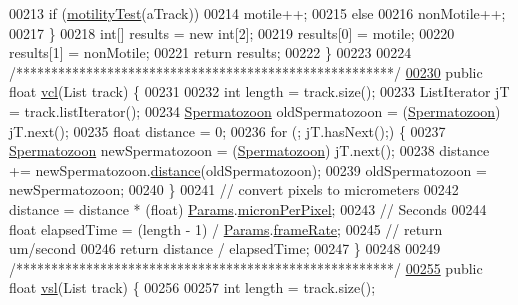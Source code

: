 \begin{DoxyCode}
00213       \textcolor{keywordflow}{if} (\hyperlink{classfunctions_1_1_kinematics_a5dbef047c19d4c554b08ba879eb7443f}{motilityTest}(aTrack))
00214         motile++;
00215       \textcolor{keywordflow}{else}
00216         nonMotile++;
00217     \}
00218     \textcolor{keywordtype}{int}[] results = \textcolor{keyword}{new} \textcolor{keywordtype}{int}[2];
00219     results[0] = motile;
00220     results[1] = nonMotile;
00221     \textcolor{keywordflow}{return} results;
00222   \}
00223   
00224   \textcolor{comment}{/******************************************************/}
\hypertarget{_kinematics_8java_source_l00230}{}\hyperlink{classfunctions_1_1_kinematics_af6e1e75567a927a9c627616cb68b0d7f}{00230}   \textcolor{keyword}{public} \textcolor{keywordtype}{float} \hyperlink{classfunctions_1_1_kinematics_af6e1e75567a927a9c627616cb68b0d7f}{vcl}(List track) \{
00231 
00232     \textcolor{keywordtype}{int} length = track.size();
00233     ListIterator jT = track.listIterator();
00234     \hyperlink{classdata_1_1_spermatozoon}{Spermatozoon} oldSpermatozoon = (\hyperlink{classdata_1_1_spermatozoon}{Spermatozoon}) jT.next();
00235     \textcolor{keywordtype}{float} distance = 0;
00236     \textcolor{keywordflow}{for} (; jT.hasNext();) \{
00237       \hyperlink{classdata_1_1_spermatozoon}{Spermatozoon} newSpermatozoon = (\hyperlink{classdata_1_1_spermatozoon}{Spermatozoon}) jT.next();
00238       distance += newSpermatozoon.\hyperlink{classdata_1_1_spermatozoon_aaef7a8e7602a08c82ea5fcbb777883e0}{distance}(oldSpermatozoon);
00239       oldSpermatozoon = newSpermatozoon;
00240     \}
00241     \textcolor{comment}{// convert pixels to micrometers}
00242     distance = distance * (float) \hyperlink{classdata_1_1_params}{Params}.\hyperlink{classdata_1_1_params_a19331ee97ef3c422984fc7dff976549e}{micronPerPixel};
00243     \textcolor{comment}{// Seconds}
00244     \textcolor{keywordtype}{float} elapsedTime = (length - 1) / \hyperlink{classdata_1_1_params}{Params}.\hyperlink{classdata_1_1_params_a398ccb086e2e7150576bec8a5853b8e3}{frameRate};
00245     \textcolor{comment}{// return um/second}
00246     \textcolor{keywordflow}{return} distance / elapsedTime;
00247   \}
00248 
00249   \textcolor{comment}{/******************************************************/}
\hypertarget{_kinematics_8java_source_l00255}{}\hyperlink{classfunctions_1_1_kinematics_a938c4a9daa152f426259a01bc6654b25}{00255}   \textcolor{keyword}{public} \textcolor{keywordtype}{float} \hyperlink{classfunctions_1_1_kinematics_a938c4a9daa152f426259a01bc6654b25}{vsl}(List track) \{
00256 
00257     \textcolor{keywordtype}{int} length = track.size();

\end{DoxyCode}
